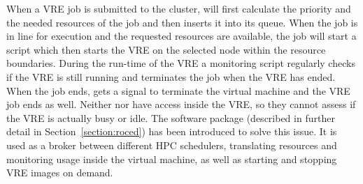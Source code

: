 When a VRE job is submitted to the \NEMO cluster, \Moab will first calculate the
priority and the needed resources of the job and then inserts it into its queue.
When the job is in line for execution and the requested resources are available,
the job will start a script which then starts the VRE on the selected node
within the resource boundaries. During the run-time of the VRE a monitoring
script regularly checks if the VRE is still running and terminates the job when
the VRE has ended.
When the job ends, \Openstack gets a signal to terminate the virtual machine and
the VRE job ends as well.  Neither \Moab nor \Openstack have access
inside the VRE, so they cannot assess if the VRE is actually busy or
idle.
The software package \Roced (described in
further detail in Section~\ref{section:roced}) has been introduced to
solve this issue.
It is used as a broker between
different HPC schedulers,  translating resources and monitoring usage inside the
virtual machine, as well as starting and stopping VRE images on demand.

